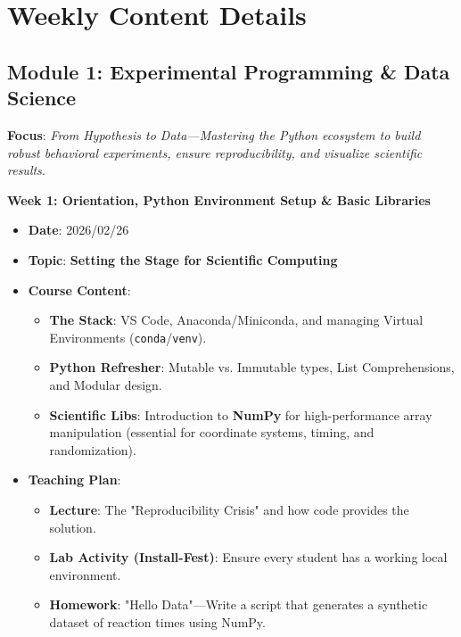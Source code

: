 \section{Weekly Content Details}

\subsection*{Module 1: Experimental Programming \& Data Science}
\noindent\textbf{Focus}: \textit{From Hypothesis to Data—Mastering the Python ecosystem to build robust behavioral experiments, ensure reproducibility, and visualize scientific results.}

\vspace{0.3cm}

\noindent\textbf{Week 1: Orientation, Python Environment Setup \& Basic Libraries}
\begin{itemize}
    \item \textbf{Date}: 2026/02/26
    \item \textbf{Topic}: \textbf{Setting the Stage for Scientific Computing}
    \item \textbf{Course Content}:
    \begin{itemize}
        \item \textbf{The Stack}: VS Code, Anaconda/Miniconda, and managing Virtual Environments (\texttt{conda}/\texttt{venv}).
        \item \textbf{Python Refresher}: Mutable vs. Immutable types, List Comprehensions, and Modular design.
        \item \textbf{Scientific Libs}: Introduction to \textbf{NumPy} for high-performance array manipulation (essential for coordinate systems, timing, and randomization).
    \end{itemize}
    \item \textbf{Teaching Plan}:
    \begin{itemize}
        \item \textbf{Lecture}: The "Reproducibility Crisis" and how code provides the solution.
        \item \textbf{Lab Activity (Install-Fest)}: Ensure every student has a working local environment.
        \item \textbf{Homework}: "Hello Data"—Write a script that generates a synthetic dataset of reaction times using NumPy.
    \end{itemize}
\end{itemize}

